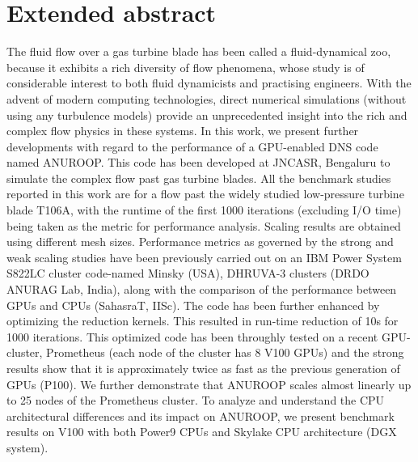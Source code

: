 \documentclass[]{article}
\begin{document}
\section*{Extended abstract}
The  fluid  flow  over  a  gas  turbine  blade  has  been  called  a  fluid-dynamical  zoo,  because  it  exhibits a rich diversity of  flow  phenomena,  whose  study is of considerable interest to both fluid dynamicists and practising engineers. With the advent of modern computing technologies, direct numerical simulations (without using any turbulence models) provide an unprecedented insight into the rich and complex flow physics in these systems. 
In this work, we present further developments with regard to the performance of a GPU-enabled DNS code named ANUROOP. This code has been developed at JNCASR, Bengaluru to simulate the complex flow past gas turbine blades. All the benchmark studies reported in this work are for a flow past the widely studied low-pressure turbine blade T106A, with the runtime of the first 1000 iterations (excluding I/O time) being taken as the metric for performance analysis. Scaling results are obtained using different mesh sizes. Performance metrics as governed by the strong and weak scaling studies have been previously carried out on an IBM Power System S822LC cluster code-named Minsky (USA), DHRUVA-3 clusters (DRDO ANURAG Lab, India), along with the comparison of the performance between GPUs and CPUs (SahasraT, IISc). The code has been further enhanced by optimizing the reduction kernels. This resulted in run-time reduction of 10s for 1000 iterations. This optimized code has been throughly tested on a recent GPU-cluster, Prometheus (each node of the cluster has 8 V100 GPUs) and the strong results show that it is approximately twice as fast as the previous generation of GPUs (P100). We further demonstrate that ANUROOP scales almost linearly up to 25 nodes of the Prometheus cluster. To analyze and understand the CPU architectural differences and its impact on ANUROOP, we present benchmark results on V100 with both Power9 CPUs and Skylake CPU architecture (DGX system).  



\end{document}
